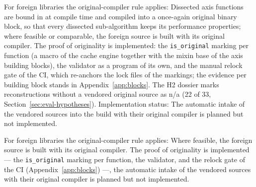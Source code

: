 \begin{nurlang}
For foreign libraries the original-compiler rule applies: Dissected axis functions are bound in at
compile time and compiled into a once-again original binary block, so that every dissected
sub-algorithm keeps its performance properties; where feasible or comparable, the foreign source is
built with its original compiler. The proof of originality is implemented: the \texttt{is\_original}
marking per function (a macro of the cache engine together with the mixin base of the axis building
blocks), the validator as a program of its own, and the manual relock gate of the CI, which
re-anchors the lock files of the markings; the evidence per building block stands in
Appendix~\ref{app:blocks}. The H2 dossier marks reconstructions without a vendored original source as
n/a (22 of 33, Section~\ref{sec:eval-hypotheses}). Implementation status: The automatic intake of the
vendored sources into the build with their original compiler is planned but not implemented.
\end{nurlang}
\begin{nurkurz}
For foreign libraries the original-compiler rule applies: Where feasible, the foreign source is built with
its original compiler. The proof of originality is implemented --- the \texttt{is\_original} marking per
function, the validator, and the relock gate of the CI (Appendix~\ref{app:blocks}) ---, the automatic intake
of the vendored sources with their original compiler is planned but not implemented.
\end{nurkurz}

